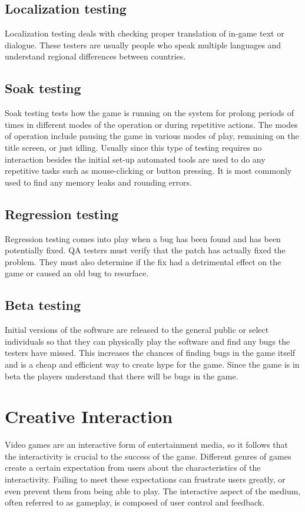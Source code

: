 \subsection{Localization testing} Localization testing deals with checking proper translation of in-game text or dialogue. These testers are usually people who speak multiple languages and understand regional differences between countries.

\subsection{Soak testing} Soak testing tests how the game is running on the system for prolong periods of times in different modes of the operation or during repetitive actions. The modes of operation include pausing the game in various modes of play, remaining on the title screen, or just idling. Usually since this type of testing requires no interaction besides the initial set-up automated tools are used to do any repetitive tasks such as mouse-clicking or button pressing. It is most commonly used to find any memory leaks and rounding errors.

\subsection{Regression testing} Regression testing comes into play when a bug has been found and has been potentially fixed. QA testers must verify that the patch has actually fixed the problem. They must also determine if the fix had a detrimental effect on the game or caused an old bug to resurface.

\subsection{Beta testing} Initial versions of the software are released to the general public or select individuals so that they can physically play the software and find any bugs the testers have missed. This increases the chances of finding bugs in the game itself and is a cheap and efficient way to create hype for the game. Since the game is in beta the players understand that there will be bugs in the game.

\section{Creative Interaction}

Video games are an interactive form of entertainment media, so it follows that the interactivity is crucial to the success of the game. Different genres of games create a certain expectation from users about the characteristics of the interactivity. Failing to meet these expectations can frustrate users greatly, or even prevent them from being able to play\cite{inter_design_pttrns}. The interactive aspect of the medium, often referred to as gameplay, is composed of user control and feedback. 

